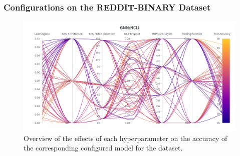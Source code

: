 \subsubsection{\gnn Configurations on the REDDIT-BINARY Dataset}
\begin{figure}[H]
    \centering
    \includegraphics[width=\textwidth, trim={0 75 0 150}, clip]{Figures/hyperparameter_gnn_reddit.png}
    \caption{Overview of the effects of each hyperparameter on the accuracy of the corresponding configured \gnn model for the \reddit dataset.}
    \label{fig:wandb_gnn_reddit}
\end{figure}
\clearpage

